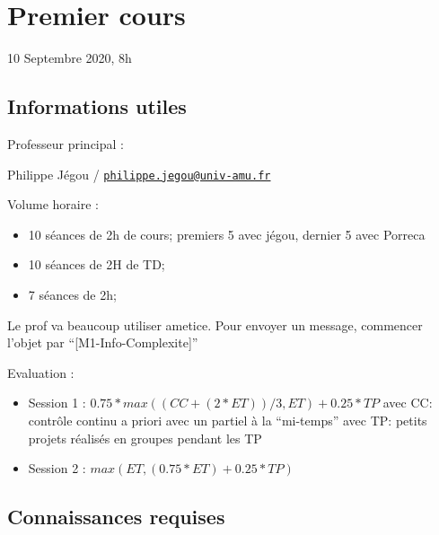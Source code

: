 \hypertarget{premier-cours}{%
\section{Premier cours}\label{premier-cours}}

10 Septembre 2020, 8h

\hypertarget{informations-utiles}{%
\subsection{Informations utiles}\label{informations-utiles}}

Professeur principal :

Philippe Jégou /
\href{mailto:philippe.jegou@univ-amu.fr}{\nolinkurl{philippe.jegou@univ-amu.fr}}

Volume horaire :

\begin{itemize}
\tightlist
\item
  10 séances de 2h de cours; premiers 5 avec jégou, dernier 5 avec
  Porreca
\item
  10 séances de 2H de TD;
\item
  7 séances de 2h;
\end{itemize}

Le prof va beaucoup utiliser ametice. Pour envoyer un message, commencer
l'objet par ``{[}M1-Info-Complexite{]}''

Evaluation :

\begin{itemize}
\tightlist
\item
  Session 1 : \(0.75 * max((CC + (2 * ET)) / 3, ET) + 0.25 * TP\) avec
  CC: contrôle continu a priori avec un partiel à la ``mi-temps'' avec
  TP: petits projets réalisés en groupes pendant les TP
\item
  Session 2 : \(max(ET, (0.75 * ET) + 0.25 * TP)\)
\end{itemize}

\hypertarget{connaissances-requises}{%
\subsection{Connaissances requises}\label{connaissances-requises}}

